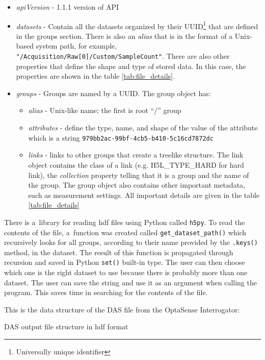 \begin{itemize}
    \item \textit{apiVersion} - 1.1.1 version of API
    \item \textit{datasets} - Contain all the datasets organized by their UUID\footnote{Universally unique identifier} that are defined in the groups section. There is also an \textit{alias} that is in the format of a Unix-based system path, for example, \verb|"/Acquisition/Raw[0]/Custom/SampleCount"|. There are also other properties that define the shape and type of stored data. In this case, the properties are shown in the table \ref{tab:file_details}.
    \item \textit{groups} - Groups are named by a UUID. The group object has:
        \begin{itemize}
            \item \textit{alias} - Unix-like name; the first is root ``/'' group
            \item \textit{attributes} - define the type, name, and shape of the value of the attribute which is a string \verb|979bb2ac-99bf-4cb5-b410-5c16cd7872dc|
            \item \textit{links} - links to other groups that create a treelike structure. The link object contains the class of a link (e.g. H5L\_TYPE\_HARD for hard link), the \textit{collection} property telling that it is a group and the name of the group. The group object also contains other important metadata, such as measurement settings. All important details are given in the table \ref{tab:file_details}
        \end{itemize}
\end{itemize}

There is a~library for reading \ac{hdf} files using Python called \verb|h5py|. To read the contents of the file, a~function was created called \verb|get_dataset_path()| which recursively looks for all groups, according to their name provided by the \verb|.keys()| method, in the dataset. The result of this function is propagated through recursion and saved in Python \verb|set()| built-in type. The user can then choose which one is the right dataset to use because there is probably more than one dataset. The user can save the string and use it as an argument when calling the program. This saves time in searching for the contents of the file. 

This is the data structure of the DAS file from the OptaSense Interrogator:

\bigskip
DAS output file structure in \ac{hdf} format
{\small
%
\label{dir:filestructure}
}
\bigskip

